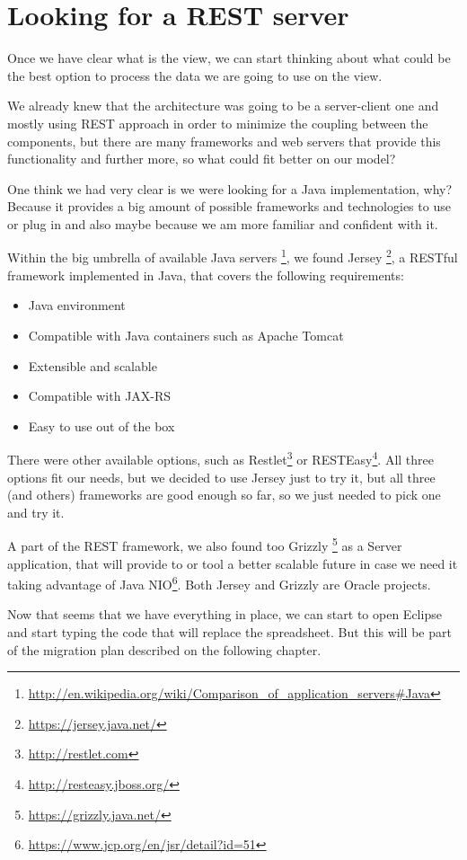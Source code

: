 \section{Looking for a REST server}
Once we have clear what is the view, we can start thinking about what could be
the best option to process the data we are going to use on the view.

We already knew that the architecture was going to be a server-client one and
mostly using REST approach in order to minimize the coupling between the
components, but there are many frameworks and web servers that provide this
functionality and further more, so what could fit better on our model?

One think we had very clear is we were looking for a Java implementation, why?
Because it provides a big amount of possible frameworks and technologies to
use or plug in and also maybe because we am more familiar and confident
with it.

Within the big umbrella of available Java servers
\footnote{\url{http://en.wikipedia.org/wiki/Comparison\_of\_application\_servers\#Java}},
we found Jersey \footnote{\url{https://jersey.java.net/}}, a
RESTful framework implemented in Java, that covers the following
requirements:
\begin{itemize}
  \item Java environment
  \item Compatible with Java containers such as Apache Tomcat 
  \item Extensible and scalable
  \item Compatible with JAX-RS
  \item Easy to use out of the box
\end{itemize}

There were other available options, such as
Restlet\footnote{\url{http://restlet.com}} or
RESTEasy\footnote{\url{http://resteasy.jboss.org/}}. All three options fit our
needs, but we decided to use Jersey just to try it, but all three (and others)
frameworks are good enough so far, so we just needed to pick one and try it.

A part of the REST framework, we also found too Grizzly
\footnote{\url{https://grizzly.java.net/}} as a Server application, that will
provide to or tool a better scalable future in case we need it taking
advantage of Java NIO\footnote{\url{https://www.jcp.org/en/jsr/detail?id=51}}.
Both Jersey and Grizzly are Oracle projects.

Now that seems that we have everything in place, we can start to open Eclipse
and start typing the code that will replace the spreadsheet. But this will be
part of the migration plan described on the following chapter.

